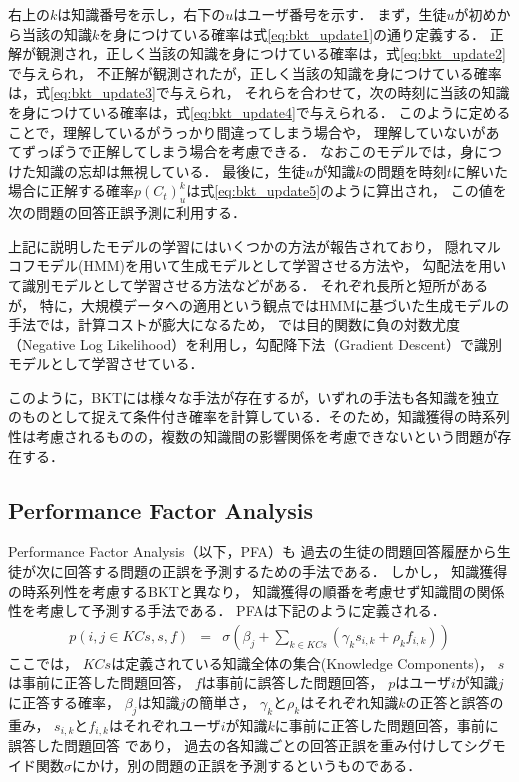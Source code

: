 右上の$k$は知識番号を示し，右下の$u$はユーザ番号を示す．
まず，生徒$u$が初めから当該の知識$k$を身につけている確率は式\ref{eq:bkt_update1}の通り定義する．
正解が観測され，正しく当該の知識を身につけている確率は，式\ref{eq:bkt_update2}で与えられ，
不正解が観測されたが，正しく当該の知識を身につけている確率は，式\ref{eq:bkt_update3}で与えられ，
それらを合わせて，次の時刻に当該の知識を身につけている確率は，式\ref{eq:bkt_update4}で与えられる．
このように定めることで，理解しているがうっかり間違ってしまう場合や， 理解していないがあてずっぽうで正解してしまう場合を考慮できる．
なおこのモデルでは，身につけた知識の忘却は無視している．
最後に，生徒$u$が知識$k$の問題を時刻$t$に解いた場合に正解する確率$p(C_{t})^{k}_{u}$は式\ref{eq:bkt_update5}のように算出され，
この値を次の問題の回答正誤予測に利用する．
 
上記に説明したモデルの学習にはいくつかの方法が報告されており，
隠れマルコフモデル(HMM)を用いて生成モデルとして学習させる方法\cite{corbett1994knowledge}や，
勾配法を用いて識別モデルとして学習させる方法\cite{yudelson2013individualized}などがある．
それぞれ長所と短所があるが，
特に，大規模データへの適用という観点ではHMMに基づいた生成モデルの手法では，計算コストが膨大になるため，
\cite{yudelson2013individualized}では目的関数に負の対数尤度（Negative Log Likelihood）を利用し，勾配降下法（Gradient Descent）で識別モデルとして学習させている．

このように，BKTには様々な手法が存在するが，いずれの手法も各知識を独立のものとして捉えて条件付き確率を計算している．そのため，知識獲得の時系列性は考慮されるものの，複数の知識間の影響関係を考慮できないという問題が存在する．

\subsection{Performance Factor Analysis}
Performance Factor Analysis\cite{pavlik2009performance}（以下，PFA）も
過去の生徒の問題回答履歴から生徒が次に回答する問題の正誤を予測するための手法である．
しかし，
知識獲得の時系列性を考慮するBKTと異なり，
知識獲得の順番を考慮せず知識間の関係性を考慮して予測する手法である．
PFAは下記のように定義される．
\begin{eqnarray}
	p(i, j \in KCs, s, f) & = & \sigma( \beta _j + \sum_{k \in KCs}(\gamma_k s_{i, k} + \rho _k f_{i, k}) )
\end{eqnarray}
ここでは，
$KCs$は定義されている知識全体の集合(Knowledge Components)，
$s$は事前に正答した問題回答，
$f$は事前に誤答した問題回答，
$p$はユーザ$i$が知識$j$に正答する確率，
$\beta_j$は知識$j$の簡単さ，
$\gamma_k$と$\rho_k$はそれぞれ知識$k$の正答と誤答の重み，
$s_{i, k}$と$f_{i, k}$はそれぞれユーザ$i$が知識$k$に事前に正答した問題回答，事前に誤答した問題回答
であり，
過去の各知識ごとの回答正誤を重み付けしてシグモイド関数$\sigma$にかけ，別の問題の正誤を予測するというものである．


